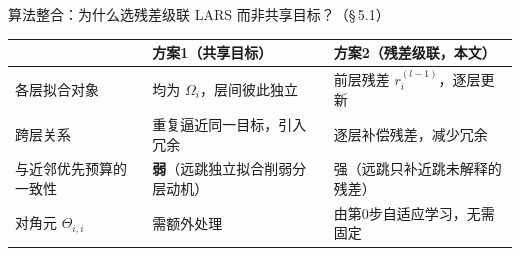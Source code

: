 \documentclass[aspectratio=169,9pt,xcolor=dvipsnames]{beamer}
\newcommand{\highlight}[1]{\textcolor{myred}{\textbf{#1}}}
\newcommand{\green}[1]{\textcolor{mygreen}{#1}}
\begin{document}
\begin{frame}{算法整合：为什么选残差级联 LARS 而非共享目标？（§\,5.1）}
\vspace{0.08cm}
\begin{tabular}{p{2.2cm}p{5.3cm}p{5.3cm}}
  \toprule
  & \textbf{方案1（共享目标）} & \textbf{方案2（残差级联，本文）} \\
  \midrule
  各层拟合对象 & 均为 $\Omega_i$，层间彼此独立 & 前层残差 $r_i^{(l-1)}$，逐层更新 \\
  跨层关系 & 重复逼近同一目标，引入冗余 & 逐层补偿残差，减少冗余 \\
  与近邻优先预算的一致性 & \highlight{弱}（远跳独立拟合削弱分层动机） & \green{强}（远跳只补近跳未解释的残差） \\
  对角元 $\Theta_{i,i}$ & 需额外处理 & 由第0步自适应学习，无需固定 \\
  \bottomrule
\end{tabular}
\vspace{0.05cm}

\end{frame}
\end{document}
